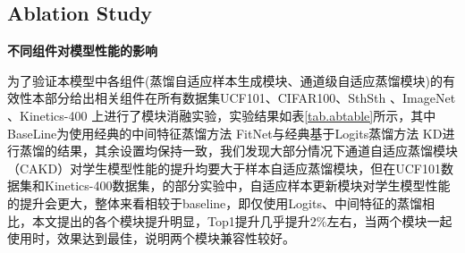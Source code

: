 \documentclass[10.5pt,letterpaper]{article}
\begin{document}
\subsection{Ablation Study}
\begin{table}[!t]
\centering
\caption{Statistics of Dataset.}
\label{tbl:dataset}
\end{table}
\textbf{不同组件对模型性能的影响}

为了验证本模型中各组件(蒸馏自适应样本生成模块、通道级自适应蒸馏模块)的有效性本部分给出相关组件在所有数据集UCF101\cite{soomro-arxiv2012-ucf101}、CIFAR100\cite{wah-2011-cifar}、SthSth  \cite{goyal-iccv2017-sthsth}、ImageNet \cite{krizhevsky-nips2012-imagenet}、Kinetics-400   \cite{kay-arXiv2017-kinetics}上进行了模块消融实验，实验结果如表\ref{tab.abtable}所示，其中BaseLine为使用经典的中间特征蒸馏方法	FitNet\cite{romero-iclr2015-fitnets}与经典基于Logits蒸馏方法	KD\cite{geoffrey-arxiv2015-kd}进行蒸馏的结果，其余设置均保持一致，我们发现大部分情况下通道自适应蒸馏模块（CAKD）对学生模型性能的提升均要大于样本自适应蒸馏模块，但在UCF101数据集和Kinetics-400数据集，的部分实验中，自适应样本更新模块对学生模型性能的提升会更大，整体来看相较于baseline，即仅使用Logits、中间特征的蒸馏相比，本文提出的各个模块提升明显，Top1提升几乎提升2\%左右，当两个模块一起使用时，效果达到最佳，说明两个模块兼容性较好。
\end{document}
